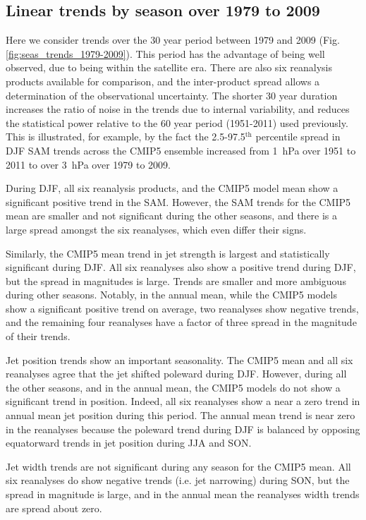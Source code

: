 \documentclass{ametsoc}
\begin{document}
\subsection{Linear trends by season over 1979 to 2009}
Here we consider trends over the 30 year period between 1979 and 2009 (Fig. \ref{fig:seas_trends_1979-2009}). 
This period has the advantage
of being well observed, due to being within the satellite era. There are also six reanalysis 
products available for comparison, and the inter-product spread allows a determination of the 
observational uncertainty. The shorter 30 year duration increases the ratio of noise 
in the trends due to internal  variability, and reduces the statistical power relative to the 
60 year period (1951-2011) used previously.  This is illustrated, for example, by the fact 
the 2.5-97.5$^\textrm{th}$ percentile spread in DJF SAM trends across the CMIP5 ensemble 
increased from 1~hPa over 1951 to 2011 to over 3~hPa over 1979 to 2009.

During DJF, all six reanalysis products, and the CMIP5 model mean show a significant positive trend
in the SAM. However, the SAM trends for the CMIP5 mean are smaller and not significant 
during the other seasons, and there is a large spread amongst the six reanalyses, 
which even differ their signs.

Similarly, the CMIP5 mean trend in jet strength is largest and statistically significant during DJF. 
All six reanalyses also show a positive trend during DJF, but the spread in magnitudes is large. 
Trends are smaller and more ambiguous during other seasons. Notably, in the annual mean, 
while the CMIP5 models show a significant positive trend on average, two reanalyses show 
negative trends, and the remaining four reanalyses have a 
factor of three spread in the magnitude of their trends.

Jet position trends show an important seasonality. The CMIP5
mean and all six reanalyses agree that the jet shifted poleward during DJF. However, during
all the other seasons, and in the annual mean, the CMIP5 models do not show a significant trend
in position. Indeed, all six reanalyses show a near a zero trend in annual mean 
jet position during this period. The annual mean trend is near zero in the reanalyses because the 
poleward trend during DJF is balanced by opposing equatorward trends in jet position during JJA
and SON.

Jet width trends are not significant during any season for the CMIP5 mean. All six reanalyses
do show negative trends (i.e. jet narrowing) during SON, but the spread in magnitude is large,
and in the annual mean the reanalyses width trends are spread about zero.
\end{document}
